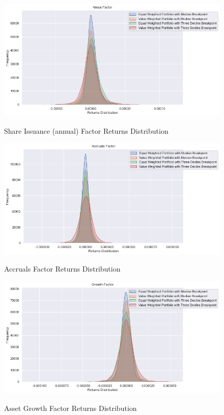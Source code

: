 \begin{figure}[H]
	\caption{Share Issuance (annual) Factor Returns Distribution}
	\centering
	\includegraphics[scale=.63]{../../output/figures/nissa.png}
	\label{fig:nissa}
\end{figure}

\begin{figure}[H]
	\caption{Accruals Factor Returns Distribution}
	\centering
	\includegraphics[scale=.63]{../../output/figures/accruals.png}
	\label{fig:accruals}
\end{figure}

\begin{figure}[H]
	\caption{Asset Growth Factor Returns Distribution}
	\centering
	\includegraphics[scale=.63]{../../output/figures/growth.png}
	\label{fig:growth}
\end{figure}

